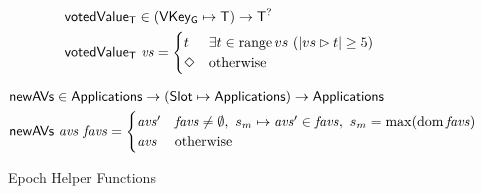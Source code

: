 \begin{figure}[htb]
  \begin{align*}
      & \mathsf{votedValue_T} \in (\mathsf{VKey_G}\mapsto\mathsf{T}) \to \mathsf{T}^?\\
      & \mathsf{votedValue_T}~\mathit{vs} =
        \begin{cases}
          t & \exists t\in\operatorname{range}{vs}~(|vs\rhd t|\geq 5) \\
          \Diamond & \text{otherwise} \\
        \end{cases}
  \end{align*}

  \begin{align*}
      & \mathsf{newAVs} \in \mathsf{Applications} \to (\mathsf{Slot}\mapsto\mathsf{Applications}) \to \mathsf{Applications} \\
      & \mathsf{newAVs}~\mathit{avs}~\mathit{favs} =
        \begin{cases}
          \mathit{avs}' & \mathit{favs}\neq\emptyset
                       ,~s_m\mapsto\mathit{avs'}\in\mathit{favs}
                       ,~s_m=\max(\operatorname{dom}{\mathit{favs}})\\
          \mathit{avs} & \text{otherwise}
        \end{cases}
  \end{align*}

  \caption{Epoch Helper Functions}
  \label{fig:funcs:helper-updates}
\end{figure}



